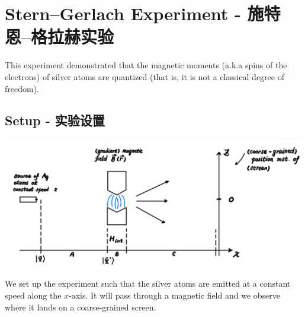 \section{Stern--Gerlach Experiment - 施特恩--格拉赫实验}
This experiment demonstrated that the magnetic moments (a.k.a spins of the electrons) of silver atoms are quantized (that is, it is not a classical degree of freedom).

\subsection{Setup - 实验设置}
\begin{center}
    \includegraphics[scale = 0.45]{stern-gerlach-setup.png}
\end{center}
We set up the experiment such that the silver atoms are emitted at a constant speed along the $x$-axis. It will pass through a magnetic field and we observe where it lands on a coarse-grained screen.


